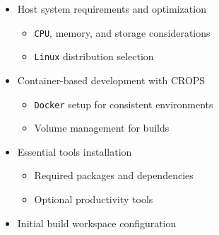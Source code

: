 \documentclass[
]{article}
\providecommand{\tightlist}{%
  \setlength{\itemsep}{0pt}\setlength{\parskip}{0pt}}
\begin{document}
\begin{itemize}
\begin{itemize}
    \begin{itemize}
    \tightlist
    \item
      Host system requirements and optimization

      \begin{itemize}
      \tightlist
      \item
        \texttt{CPU}, memory, and storage considerations
      \item
        \texttt{Linux} distribution selection
      \end{itemize}
    \item
      Container-based development with CROPS

      \begin{itemize}
      \tightlist
      \item
        \texttt{Docker} setup for consistent environments
      \item
        Volume management for builds
      \end{itemize}
    \item
      Essential tools installation

      \begin{itemize}
      \tightlist
      \item
        Required packages and dependencies
      \item
        Optional productivity tools
      \end{itemize}
    \item
      Initial build workspace configuration
    \end{itemize}
  \end{itemize}
\end{itemize}
\end{document}
